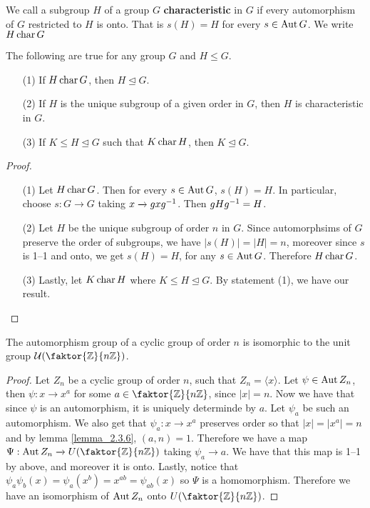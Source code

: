 \begin{definition}
  We call a subgroup $H$ of a group  $G$  \textbf{characteristic} in $G$ if
  every automorphism of $G$ restricted to  $H$ is onto. That is $s(H)=H$ for
  every $s \in \operatorname{Aut}{G}$. We write $H \operatorname{char}{G}$
\end{definition}

\begin{lemma}\label{lemma_4.4.4}
  The following are true for any group $G$ and  $H \leq G$.
  \begin{enumerate}
    \item[(1)] If $H \operatorname{char}{G}$, then $H \unlhd{G}$.

    \item[(2)] If $H$ is the unique subgroup of a given order in  $G$, then
      $H$ is characteristic in  $G$.

    \item[(3)] If $K \leq H \unlhd G$ such that  $K \operatorname{char}{H}$, then $K
      \unlhd G$.
  \end{enumerate}
\end{lemma}
\begin{proof}
  \begin{enumerate}
    \item[(1)] Let $H \operatorname{char}{G}$. Then for every $s \in \operatorname{Aut}{G}$, $s(H)=H$.
      In particular, choose $s:G \xrightarrow{} G$ taking $x
      \xrightarrow{} gxg^{-1}$. Then $gHg^{-1}=H$.

    \item[(2)] Let $H$ be the unique subgroup of order $n$ in $G$. Since
      automorphsims of $G$ preserve the order of subgroups, we have
      $|s(H)|=|H|=n$, moreover since $s$ is 1--1 and onto, we get
      $s(H)=H$, for any $s \in \operatorname{Aut}{G}$. Therefore $H \operatorname{char}{G}$.

    \item[(3)] Lastly, let $K \operatorname{char}{H}$ where $K \leq H \unlhd G$. By
      statement (1), we have our result.
  \end{enumerate}
\end{proof}

\begin{theorem}\label{lemma_4.4.5}
  The automorphism group of a cyclic group of order $n$ is isomorphic to the
  unit group $\Uc{(\faktor{\Z}{n\Z})}$.
\end{theorem}
\begin{proof}
  Let $Z_n$ be a cyclic group of order $n$, such that $Z_n=\langle x \rangle$.
  Let $\psi \in \operatorname{Aut}{Z_n}$, then $\psi:x \xrightarrow{} x^a$ for some $a \in
  \faktor{\Z}{n\Z}$, since $|x|=n$. Now we have that since $\psi$ is an
  automorphism, it is uniquely determinde by $a$. Let $\psi_a$ be such an
  automorphism. We also get that  $\psi_a:x \xrightarrow{} x^a$ preserves
  order so that $|x|=|x^a|=n$ and by lemma \ref{lemma_2.3.6}, $(a,n)=1$.
  Therefore we have a map $\Psi:\Aut{Z_n} \xrightarrow{} U(\faktor{\Z}{n\Z})$
  taking $\psi_a \xrightarrow{} a$. We have that this map is 1--1 by above,
  and moreover it is onto. Lastly, notice that
  $\psi_a\psi_b(x)=\psi_a(x^b)=x^{ab}=\psi_{ab}(x)$ so $\Psi$ is a
  homomorphism. Therefore we have an isomorphism of $\operatorname{Aut}{Z_n}$ onto
  $U(\faktor{\Z}{n\Z})$.
\end{proof}

